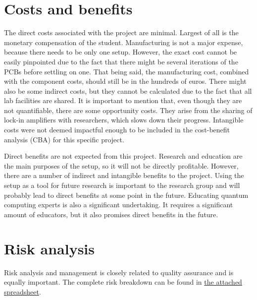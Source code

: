 \documentclass{report}
\begin{document}
	\chapter{Costs and benefits}
	The direct costs associated with the project are minimal. Largest of all is the monetary compensation of the student. Manufacturing is not a major expense, because there needs to be only one setup. However, the exact cost cannot be easily pinpointed due to the fact that there might be several iterations of the PCBs before settling on one. That being said, the manufacturing cost, combined with the component costs, should still be in the hundreds of euros. There might also be some indirect costs, but they cannot be calculated due to the fact that all lab facilities are shared. It is important to mention that, even though they are not quantifiable, there are some opportunity costs. They arise from the sharing of lock-in amplifiers with researchers, which slows down their progress. Intangible costs were not deemed impactful enough to be included in the cost-benefit analysis (CBA) for this specific project. 
	
	Direct benefits are not expected from this project. Research and education are the main purposes of the setup, so it will not be directly profitable. However, there are a number of indirect and intangible benefits to the project. Using the setup as a tool for future research is important to the research group and will probably lead to direct benefits at some point in the future. Educating quantum computing experts is also a significant undertaking. It requires a significant amount of educators, but it also promises direct benefits in the future.
	
	\chapter{Risk analysis}
	Risk analysis and management is closely related to quality assurance and is equally important. The complete risk breakdown can be found in \href{run: ./risk_analysis.xlsm}{the attached spreadsheet}. 
	
	
	
	\printbibliography
	
\end{document}
